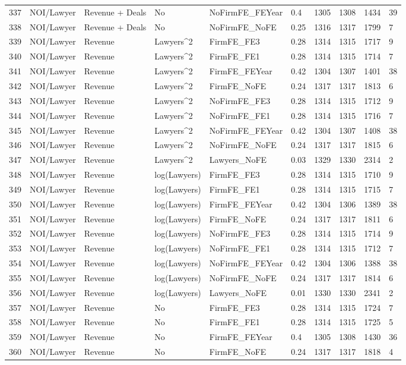 \documentclass{article}
\begin{document}
\begin{table}[H]
\begin{tabular}{rlllllllll}
  337 & NOI/Lawyer & Revenue + Deals & No & NoFirmFE\_FEYear & 0.4 & 1305 & 1308 & 1434 & 39 \\ 
  338 & NOI/Lawyer & Revenue + Deals & No & NoFirmFE\_NoFE & 0.25 & 1316 & 1317 & 1799 & 7 \\ 
  339 & NOI/Lawyer & Revenue & Lawyers^2 & FirmFE\_FE3 & 0.28 & 1314 & 1315 & 1717 & 9 \\ 
  340 & NOI/Lawyer & Revenue & Lawyers^2 & FirmFE\_FE1 & 0.28 & 1314 & 1315 & 1714 & 7 \\ 
  341 & NOI/Lawyer & Revenue & Lawyers^2 & FirmFE\_FEYear & 0.42 & 1304 & 1307 & 1401 & 38 \\ 
  342 & NOI/Lawyer & Revenue & Lawyers^2 & FirmFE\_NoFE & 0.24 & 1317 & 1317 & 1813 & 6 \\ 
  343 & NOI/Lawyer & Revenue & Lawyers^2 & NoFirmFE\_FE3 & 0.28 & 1314 & 1315 & 1712 & 9 \\ 
  344 & NOI/Lawyer & Revenue & Lawyers^2 & NoFirmFE\_FE1 & 0.28 & 1314 & 1315 & 1716 & 7 \\ 
  345 & NOI/Lawyer & Revenue & Lawyers^2 & NoFirmFE\_FEYear & 0.42 & 1304 & 1307 & 1408 & 38 \\ 
  346 & NOI/Lawyer & Revenue & Lawyers^2 & NoFirmFE\_NoFE & 0.24 & 1317 & 1317 & 1815 & 6 \\ 
  347 & NOI/Lawyer & Revenue & Lawyers^2 & Lawyers\_NoFE & 0.03 & 1329 & 1330 & 2314 & 2 \\ 
  348 & NOI/Lawyer & Revenue & log(Lawyers) & FirmFE\_FE3 & 0.28 & 1314 & 1315 & 1710 & 9 \\ 
  349 & NOI/Lawyer & Revenue & log(Lawyers) & FirmFE\_FE1 & 0.28 & 1314 & 1315 & 1715 & 7 \\ 
  350 & NOI/Lawyer & Revenue & log(Lawyers) & FirmFE\_FEYear & 0.42 & 1304 & 1306 & 1389 & 38 \\ 
  351 & NOI/Lawyer & Revenue & log(Lawyers) & FirmFE\_NoFE & 0.24 & 1317 & 1317 & 1811 & 6 \\ 
  352 & NOI/Lawyer & Revenue & log(Lawyers) & NoFirmFE\_FE3 & 0.28 & 1314 & 1315 & 1714 & 9 \\ 
  353 & NOI/Lawyer & Revenue & log(Lawyers) & NoFirmFE\_FE1 & 0.28 & 1314 & 1315 & 1712 & 7 \\ 
  354 & NOI/Lawyer & Revenue & log(Lawyers) & NoFirmFE\_FEYear & 0.42 & 1304 & 1306 & 1388 & 38 \\ 
  355 & NOI/Lawyer & Revenue & log(Lawyers) & NoFirmFE\_NoFE & 0.24 & 1317 & 1317 & 1814 & 6 \\ 
  356 & NOI/Lawyer & Revenue & log(Lawyers) & Lawyers\_NoFE & 0.01 & 1330 & 1330 & 2341 & 2 \\ 
  357 & NOI/Lawyer & Revenue & No & FirmFE\_FE3 & 0.28 & 1314 & 1315 & 1724 & 7 \\ 
  358 & NOI/Lawyer & Revenue & No & FirmFE\_FE1 & 0.28 & 1314 & 1315 & 1725 & 5 \\ 
  359 & NOI/Lawyer & Revenue & No & FirmFE\_FEYear & 0.4 & 1305 & 1308 & 1430 & 36 \\ 
  360 & NOI/Lawyer & Revenue & No & FirmFE\_NoFE & 0.24 & 1317 & 1317 & 1818 & 4 \\ 
   \hline
\end{tabular}
\end{table}
\end{document}
